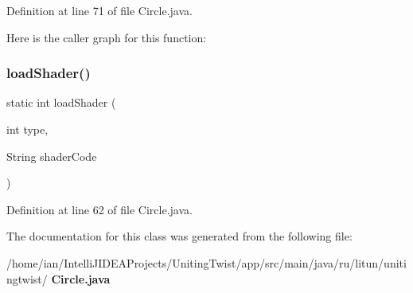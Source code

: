 Definition at line 71 of file Circle.\+java.

Here is the caller graph for this function\+:
\mbox{\label{classru_1_1litun_1_1unitingtwist_1_1_circle_a711436305cb76f8d625468db4d0cb41d}} 
\subsubsection{load\+Shader()}
{\footnotesize\ttfamily static int load\+Shader (\begin{DoxyParamCaption}\item[{int}]{type,  }\item[{String}]{shader\+Code }\end{DoxyParamCaption})\hspace{0.3cm}{\ttfamily [static]}}



Definition at line 62 of file Circle.\+java.



The documentation for this class was generated from the following file\+:\begin{DoxyCompactItemize}
\item 
/home/ian/\+Intelli\+J\+I\+D\+E\+A\+Projects/\+Uniting\+Twist/app/src/main/java/ru/litun/unitingtwist/\textbf{ Circle.\+java}\end{DoxyCompactItemize}
